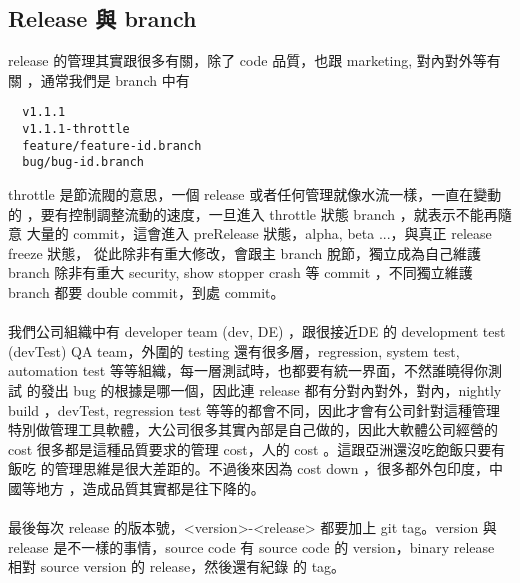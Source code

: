   \subsection{Release 與 branch}
  release 的管理其實跟很多有關，除了 code 品質，也跟 marketing, 對內對外等有關
  ，通常我們是 branch 中有
  \begin{verbatim}
  v1.1.1
  v1.1.1-throttle
  feature/feature-id.branch
  bug/bug-id.branch
  \end{verbatim}
  throttle 是節流閥的意思，一個 release 或者任何管理就像水流一樣，一直在變動的
  ，要有控制調整流動的速度，一旦進入 throttle 狀態 branch ，就表示不能再隨意
  大量的 commit，這會進入 preRelease 狀態，alpha, beta ...，與真正 release
  freeze 狀態， 從此除非有重大修改，會跟主 branch 脫節，獨立成為自己維護 branch
  除非有重大 security, show stopper crash 等 commit ，不同獨立維護 branch 都要
  double commit，到處 commit。
  \\\\
  我們公司組織中有 developer team (dev, DE) ，跟很接近DE 的 development test
  (devTest) QA team，外圍的 testing 還有很多層，regression, system test,
  automation test 等等組織，每一層測試時，也都要有統一界面，不然誰曉得你測試
  的發出 bug 的根據是哪一個，因此連 release 都有分對內對外，對內，nightly
  build ，devTest, regression test 等等的都會不同，因此才會有公司針對這種管理
  特別做管理工具軟體，大公司很多其實內部是自己做的，因此大軟體公司經營的 cost
  很多都是這種品質要求的管理 cost，人的 cost 。這跟亞洲還沒吃飽飯只要有飯吃
  的管理思維是很大差距的。不過後來因為 cost down ，很多都外包印度，中國等地方
  ，造成品質其實都是往下降的。
  \\\\
  最後每次 release 的版本號，<version>-<release> 都要加上 git tag。version
  與 release 是不一樣的事情，source code 有 source code 的 version，binary
  release 相對 source version 的 release，然後還有紀錄
  的 tag。

